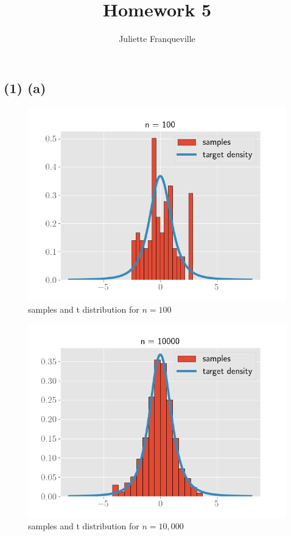 \documentclass[11pt]{article}
\begin{document}
 
\title{Homework 5}
\author{Juliette Franqueville\\
}
\maketitle

\subsection*{(1) (a)}


\begin{figure}[!h]
    \centering
    \includegraphics[scale=.6
    ]{../figures/resamples_n_100.png}
    \caption{samples and t distribution for $n=100$}
    \label{fig:my_label}
\end{figure}
\newpage

\begin{figure}[!h]
    \centering
    \includegraphics[scale=.6
    ]{../figures/resamples_n_10000.png}
    \caption{samples and t distribution for $n=10,000$}
    \label{fig:my_label}
\end{figure}
\newpage
\end{document}

